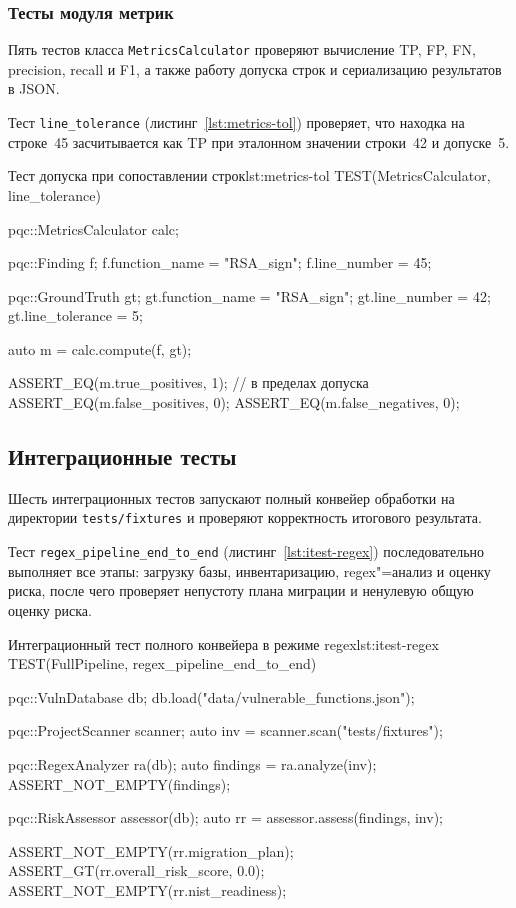 \subsubsection{Тесты модуля метрик}

Пять тестов класса \texttt{MetricsCalculator} проверяют вычисление TP,
FP, FN, precision, recall и F1, а также работу допуска строк и
сериализацию результатов в JSON.

Тест \texttt{line\_tolerance} (листинг~\ref{lst:metrics-tol}) проверяет,
что находка на строке~45 засчитывается как TP при эталонном значении
строки~42 и допуске~5.

\begin{itmolisting}[C++]{Тест допуска при сопоставлении строк}{lst:metrics-tol}
TEST(MetricsCalculator, line_tolerance) {
    pqc::MetricsCalculator calc;

    pqc::Finding f;
    f.function_name = "RSA_sign";
    f.line_number   = 45;

    pqc::GroundTruth gt;
    gt.function_name = "RSA_sign";
    gt.line_number   = 42;
    gt.line_tolerance = 5;

    auto m = calc.compute({f}, {gt});

    ASSERT_EQ(m.true_positives, 1); // в пределах допуска
    ASSERT_EQ(m.false_positives, 0);
    ASSERT_EQ(m.false_negatives, 0);
}
\end{itmolisting}

\subsection{Интеграционные тесты}

Шесть интеграционных тестов запускают полный конвейер обработки на
директории \texttt{tests/fixtures} и проверяют корректность итогового
результата.

Тест \texttt{regex\_pipeline\_end\_to\_end}
(листинг~\ref{lst:itest-regex}) последовательно выполняет все
этапы: загрузку базы, инвентаризацию, regex"=анализ и оценку риска,
после чего проверяет непустоту плана миграции и ненулевую общую оценку
риска.

\begin{itmolisting}[C++]{Интеграционный тест полного конвейера в режиме regex}{lst:itest-regex}
TEST(FullPipeline, regex_pipeline_end_to_end) {
    pqc::VulnDatabase db;
    db.load("data/vulnerable_functions.json");

    pqc::ProjectScanner scanner;
    auto inv = scanner.scan("tests/fixtures");

    pqc::RegexAnalyzer ra(db);
    auto findings = ra.analyze(inv);
    ASSERT_NOT_EMPTY(findings);

    pqc::RiskAssessor assessor(db);
    auto rr = assessor.assess(findings, inv);

    ASSERT_NOT_EMPTY(rr.migration_plan);
    ASSERT_GT(rr.overall_risk_score, 0.0);
    ASSERT_NOT_EMPTY(rr.nist_readiness);
}
\end{itmolisting}

